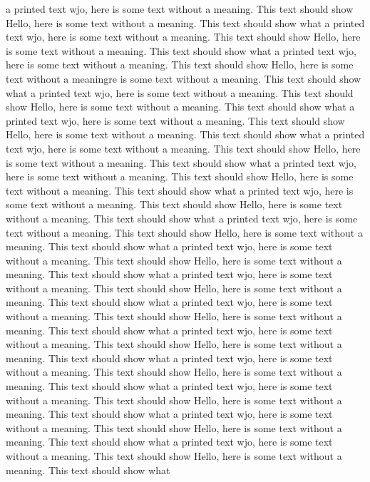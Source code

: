 \documentclass{article}
\begin{document}
\begin{multicols}{3}
a printed text wjo, here is some text without a meaning.  This text should show 
Hello, here is some text without a meaning.  This text should show what 
a printed text wjo, here is some text without a meaning.  This text should show 
Hello, here is some text without a meaning.  This text should show what 
a printed text wjo, here is some text without a meaning.  This text should show 
Hello, here is some text without a meaningre is some text without a meaning.  This text should show what 
a printed text wjo, here is some text without a meaning.  This text should show 
Hello, here is some text without a meaning.  This text should show what 
a printed text wjo, here is some text without a meaning.  This text should show 
Hello, here is some text without a meaning.  This text should show what 
a printed text wjo, here is some text without a meaning.  This text should show 
Hello, here is some text without a meaning.  This text should show what 
a printed text wjo, here is some text without a meaning.  This text should show 
Hello, here is some text without a meaning.  This text should show what 
a printed text wjo, here is some text without a meaning.  This text should show 
Hello, here is some text without a meaning.  This text should show what 
a printed text wjo, here is some text without a meaning.  This text should show 
Hello, here is some text without a meaning.  This text should show what 
a printed text wjo, here is some text without a meaning.  This text should show 
Hello, here is some text without a meaning.  This text should show what 
a printed text wjo, here is some text without a meaning.  This text should show 
Hello, here is some text without a meaning.  This text should show what 
a printed text wjo, here is some text without a meaning.  This text should show 
Hello, here is some text without a meaning.  This text should show what 
a printed text wjo, here is some text without a meaning.  This text should show 
Hello, here is some text without a meaning.  This text should show what 
a printed text wjo, here is some text without a meaning.  This text should show 
Hello, here is some text without a meaning.  This text should show what 
a printed text wjo, here is some text without a meaning.  This text should show 
Hello, here is some text without a meaning.  This text should show what 
a printed text wjo, here is some text without a meaning.  This text should show 
Hello, here is some text without a meaning.  This text should show what 
a printed text wjo, here is some text without a meaning.  This text should show 
Hello, here is some text without a meaning.  This text should show what 

\end{multicols}
\end{document}
